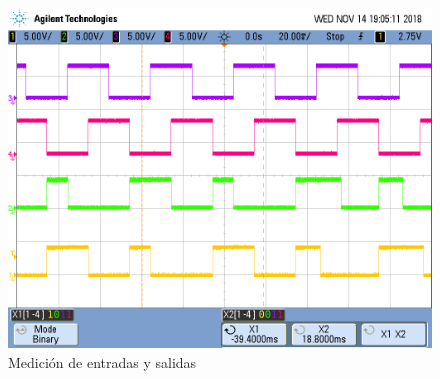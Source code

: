 \documentclass[10pt,a4paper]{article}
\begin{document}
\begin{figure}[H]
\centering
\includegraphics[scale=0.3]{images/medicion_ej1_mealy}
\caption{Medición de entradas y salidas}
\label{1_fig_medicion_mealy}
\end{figure}
\end{document}
